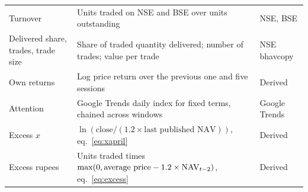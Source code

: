 \begin{table}[!t]
\begin{tabularx}{\textwidth}{L{3.2cm}YL{3.4cm}}
Turnover & Units traded on NSE and BSE over units outstanding & NSE, BSE\\
Delivered share, trades, trade size & Share of traded quantity delivered; number of trades; value per trade & NSE bhavcopy\\
Own returns & Log price return over the previous one and five sessions & Derived\\
Attention & Google Trends daily index for fixed terms, chained across windows & Google Trends\\
Excess $x$ & $\ln(\text{close}/(1.2\times\text{last published NAV}))$, eq.~\eqref{eq:xapril} & Derived\\
Excess rupees & Units traded times $\max(0,\text{average price}-1.2\times\mathrm{NAV}_{t-2})$, eq.~\eqref{eq:excess} & Derived\\
\bottomrule
\end{tabularx}
\end{table}

